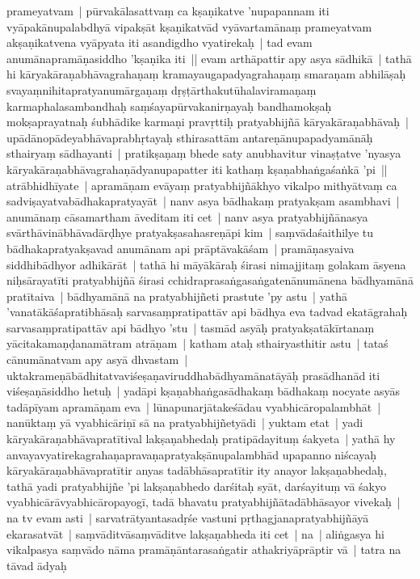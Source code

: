\documentclass[article,a4paper]{memoir}
\begin{document}
prameyatvam | pū\-rvakā\-lasattvaṃ ca kṣaṇikatve 'nupapannam iti vyā\-pakā\-nupalabdhyā\- vipakṣā\-t kṣaṇikatvā\-d vyā\-vartamā\-naṃ prameyatvam akṣaṇikatvena vyā\-pyata iti asandigdho vyatirekaḥ | \label{thakur75-116.10} tad evam anumā\-napramā\-ṇasiddho 'kṣaṇika iti || \label{thakur75-116.11} evam arthā\-pattir apy asya sā\-dhikā\- | tathā\- hi kā\-ryakā\-raṇabhā\-vagrahaṇaṃ kramayaugapadyagrahaṇaṃ smaraṇam abhilā\-ṣaḥ svayaṃnihitapratyanumā\-rgaṇaṃ dṛṣṭā\-rthakutū\-halaviramaṇaṃ karmaphalasambandhaḥ saṃśayapū\-rvakanirṇayaḥ bandhamokṣaḥ mokṣaprayatnaḥ śubhā\-dike karmaṇi pravṛttiḥ pratyabhijñā\- kā\-ryakā\-raṇabhā\-vaḥ | upā\-dā\-nopā\-deyabhā\-vaprabhṛtayaḥ sthirasattā\-m antareṇā\-nupapadyamā\-nā\-ḥ sthairyaṃ sā\-dhayanti | pratikṣaṇaṃ bhede saty anubhavitur vinaṣṭatve 'nyasya kā\-ryakā\-raṇabhā\-vagrahaṇā\-dyanupapatter iti kathaṃ kṣaṇabhaṅgaśaṅkā\- 'pi || \label{thakur75-116.17} atrā\-bhidhī\-yate | apramā\-ṇam evā\-yaṃ pratyabhijñā\-khyo vikalpo mithyā\-tvaṃ ca sadviṣayatvabā\-dhakapratyayā\-t | \label{thakur75-116.18} nanv asya bā\-dhakaṃ pratyakṣam asambhavi | anumā\-naṃ cā\-samartham ā\-veditam iti cet | nanv asya pratyabhijñā\-nasya svā\-rthā\-vinā\-bhā\-vadā\-rḍhye pratyakṣasahasreṇā\-pi kim | saṃvā\-daśaithilye tu bā\-dhakapratyakṣavad anumā\-nam api prā\-ptā\-vakā\-śam | pramā\-ṇasyaiva siddhibā\-dhyor adhikā\-rā\-t | tathā\- hi mā\-yā\-kā\-raḥ śirasi nimajjitaṃ golakam ā\-syena niḥsā\-rayatī\-ti pratyabhijñā\- śirasi cchidraprasaṅgasaṅgatenā\-numā\-nena bā\-dhyamā\-nā\- pratī\-taiva | bā\-dhyamā\-nā\- na pratyabhijñeti prastute 'py astu | \label{thakur75-116.23} yathā\- 'vanatā\-kā\-śapratibhā\-saḥ sarvasaṃpratipattā\-v api bā\-dhya eva tadvad ekatā\-grahaḥ sarvasaṃpratipattā\-v api bā\-dhyo 'stu | tasmā\-d asyā\-ḥ pratyakṣatā\-kī\-rtanaṃ yā\-citakamaṇḍanamā\-tram atrā\-ṇam | katham ataḥ sthairyasthitir astu | \label{thakur75-116.26} tataś cā\-numā\-natvam apy asyā\- dhvastam | uktakrameṇā\-bā\-dhitatvaviśeṣaṇaviruddhabā\-dhyamā\-natā\-yā\-ḥ prasā\-dhanā\-d iti viśeṣaṇā\-siddho hetuḥ | \label{thakur75-116.27} yadā\-pi kṣaṇabhaṅgasā\-dhakaṃ bā\-dhakaṃ nocyate asyā\-s tadā\-pī\-yam apramā\-ṇam eva | lū\-napunarjā\-takeśā\-dau vyabhicā\-ropalambhā\-t | \label{thakur75-1} nanū\-ktaṃ yā\- vyabhicā\-riṇī\- sā\- na pratyabhijñetyā\-di | \label{thakur75-116.30} yuktam etat | yadi kā\-ryakā\-raṇabhā\-vapratī\-tival lakṣaṇabhedaḥ pratipā\-dayituṃ śakyeta | yathā\- hy anvayavyatirekagrahaṇapravaṇapratyakṣā\-nupalambhā\-d upapanno niścayaḥ kā\-ryakā\-raṇabhā\-vapratī\-tir anyas tadā\-bhā\-sapratī\-tir ity anayor lakṣaṇabhedaḥ, tathā\- yadi pratyabhijñe 'pi lakṣaṇabhedo darśitaḥ syā\-t, darśayituṃ vā\- śakyo vyabhicā\-rā\-vyabhicā\-ropayogī\-, tadā\- bhavatu pratyabhijñā\-tadā\-bhā\-sayor vivekaḥ | na tv evam asti | sarvatrā\-tyantasadṛśe vastuni pṛthagjanapratyabhijñā\-yā\- ekarasatvā\-t | \label{thakur75-117.3} saṃvā\-ditvā\-saṃvā\-ditve lakṣaṇabheda iti cet | na | aliṅgasya hi vikalpasya saṃvā\-do nā\-ma pramā\-ṇā\-ntarasaṅgatir athakriyā\-prā\-ptir vā\- | \label{thakur75-117.4} tatra na tā\-vad ā\-dyaḥ 
\end{document}
